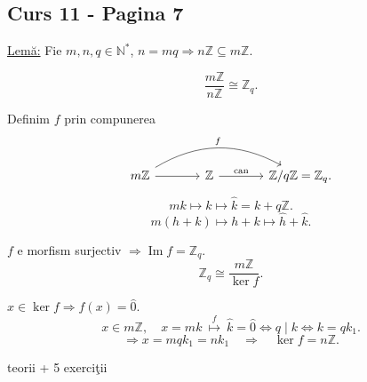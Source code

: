 
\subsection*{Curs 11 - Pagina 7}

\noindent\underline{Lem\u{a}:} Fie $m,n,q\in\mathbb N^*$, $n=mq\Rightarrow n\mathbb Z\subseteq m\mathbb Z$.

\[
\frac{m\mathbb Z}{n\mathbb Z}\cong\mathbb Z_q.
\]

\noindent Definim $f$ prin compunerea
\[
\begin{tikzcd}[column sep=large]
m\mathbb Z \arrow[r] \arrow[rr,bend left=30,"f"] &
\mathbb Z \arrow[r,"\mathrm{can}"] &
\mathbb Z/q\mathbb Z=\mathbb Z_q .
\end{tikzcd}
\]
\[
mk\longmapsto k\longmapsto \widehat{k}=k+q\mathbb Z.
\]
\[
m(h+k)\longmapsto h+k\longmapsto\widehat h+\widehat k.
\]

\noindent $f$ e morfism surjectiv $\Rightarrow \operatorname{Im}f=\mathbb Z_q$.
\[
\mathbb Z_q\cong \frac{m\mathbb Z}{\ker f}.
\]

\noindent $x\in\ker f\Rightarrow f(x)=\widehat 0$.
\[
x\in m\mathbb Z,\quad x=mk\ \stackrel{f}{\longmapsto}\ \widehat k=\widehat 0
\iff q\mid k\iff k=qk_1.
\]
\[
\Rightarrow x=mqk_1=nk_1\quad\Rightarrow\quad\ker f=n\mathbb Z.
\]

\bigskip
\begin{center}
 teorii + 5 exerci\c{t}ii
\end{center}

